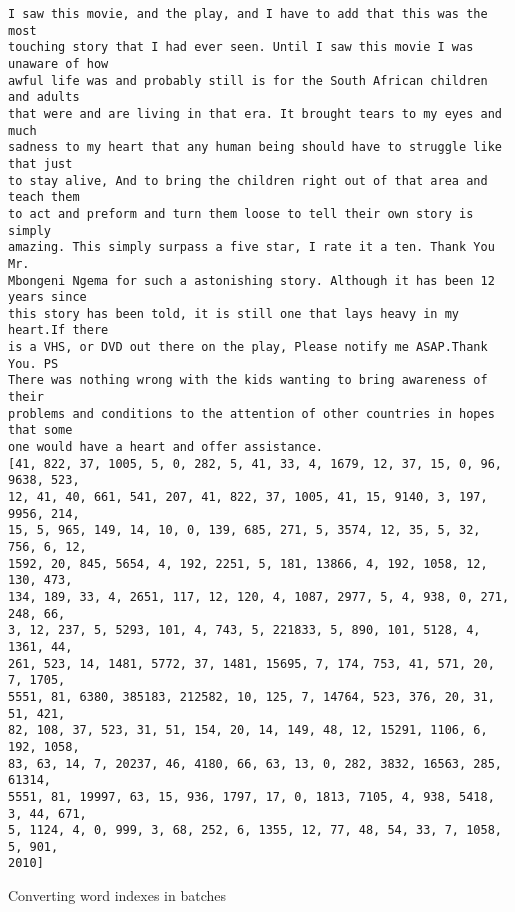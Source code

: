 \documentclass[10pt]{article}
\begin{document}
    \begin{Verbatim}[commandchars=\\\{\}]
I saw this movie, and the play, and I have to add that this was the most
touching story that I had ever seen. Until I saw this movie I was unaware of how
awful life was and probably still is for the South African children and adults
that were and are living in that era. It brought tears to my eyes and much
sadness to my heart that any human being should have to struggle like that just
to stay alive, And to bring the children right out of that area and teach them
to act and preform and turn them loose to tell their own story is simply
amazing. This simply surpass a five star, I rate it a ten. Thank You Mr.
Mbongeni Ngema for such a astonishing story. Although it has been 12 years since
this story has been told, it is still one that lays heavy in my heart.If there
is a VHS, or DVD out there on the play, Please notify me ASAP.Thank You. PS
There was nothing wrong with the kids wanting to bring awareness of their
problems and conditions to the attention of other countries in hopes that some
one would have a heart and offer assistance.
[41, 822, 37, 1005, 5, 0, 282, 5, 41, 33, 4, 1679, 12, 37, 15, 0, 96, 9638, 523,
12, 41, 40, 661, 541, 207, 41, 822, 37, 1005, 41, 15, 9140, 3, 197, 9956, 214,
15, 5, 965, 149, 14, 10, 0, 139, 685, 271, 5, 3574, 12, 35, 5, 32, 756, 6, 12,
1592, 20, 845, 5654, 4, 192, 2251, 5, 181, 13866, 4, 192, 1058, 12, 130, 473,
134, 189, 33, 4, 2651, 117, 12, 120, 4, 1087, 2977, 5, 4, 938, 0, 271, 248, 66,
3, 12, 237, 5, 5293, 101, 4, 743, 5, 221833, 5, 890, 101, 5128, 4, 1361, 44,
261, 523, 14, 1481, 5772, 37, 1481, 15695, 7, 174, 753, 41, 571, 20, 7, 1705,
5551, 81, 6380, 385183, 212582, 10, 125, 7, 14764, 523, 376, 20, 31, 51, 421,
82, 108, 37, 523, 31, 51, 154, 20, 14, 149, 48, 12, 15291, 1106, 6, 192, 1058,
83, 63, 14, 7, 20237, 46, 4180, 66, 63, 13, 0, 282, 3832, 16563, 285, 61314,
5551, 81, 19997, 63, 15, 936, 1797, 17, 0, 1813, 7105, 4, 938, 5418, 3, 44, 671,
5, 1124, 4, 0, 999, 3, 68, 252, 6, 1355, 12, 77, 48, 54, 33, 7, 1058, 5, 901,
2010]
    \end{Verbatim}

    Converting word indexes in batches
\end{document}
